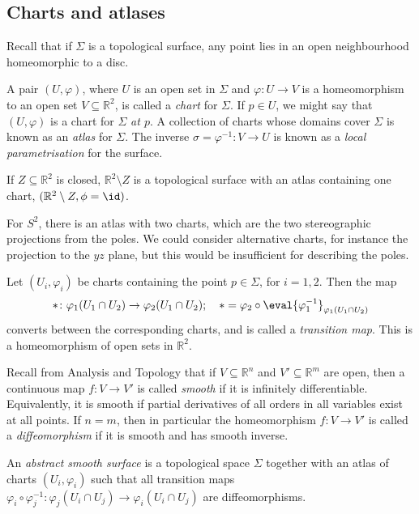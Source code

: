 \subsection{Charts and atlases}
Recall that if \( \Sigma \) is a topological surface, any point lies in an open neighbourhood homeomorphic to a disc.
\begin{definition}
	A pair \( (U, \varphi) \), where \( U \) is an open set in \( \Sigma \) and \( \varphi \colon U \to V \) is a homeomorphism to an open set \( V \subseteq \mathbb R^2 \), is called a \textit{chart} for \( \Sigma \).
	If \( p \in U \), we might say that \( (U, \varphi) \) is a chart for \( \Sigma \) \textit{at \( p \)}.
	A collection of charts whose domains cover \( \Sigma \) is known as an \textit{atlas} for \( \Sigma \).
	The inverse \( \sigma = \varphi^{-1} \colon V \to U \) is known as a \textit{local parametrisation} for the surface.
\end{definition}
\begin{example}
	If \( Z \subseteq \mathbb R^2 \) is closed, \( \mathbb R^2 \setminus Z \) is a topological surface with an atlas containing one chart, \( (\mathbb R^2 \setminus Z, \phi = \id) \).

	For \( S^2 \), there is an atlas with two charts, which are the two stereographic projections from the poles.
	We could consider alternative charts, for instance the projection to the \( yz \) plane, but this would be insufficient for describing the poles.
\end{example}
\begin{definition}
	Let \( (U_i, \varphi_i) \) be charts containing the point \( p \in \Sigma \), for \( i = 1, 2 \).
	Then the map
	\[
		\ast \colon \varphi_1(U_1 \cap U_2) \to \varphi_2(U_1 \cap U_2);\quad \ast = \varphi_2 \circ \eval{\varphi_1^{-1}}_{\varphi_1(U_1 \cap U_2)}
	\]
	converts between the corresponding charts, and is called a \textit{transition map}.
	This is a homeomorphism of open sets in \( \mathbb R^2 \).
\end{definition}
Recall from Analysis and Topology that if \( V \subseteq \mathbb R^n \) and \( V' \subseteq \mathbb R^m \) are open, then a continuous map \( f \colon V \to V' \) is called \textit{smooth} if it is infinitely differentiable.
Equivalently, it is smooth if partial derivatives of all orders in all variables exist at all points.
If \( n = m \), then in particular the homeomorphism \( f \colon V \to V' \) is called a \textit{diffeomorphism} if it is smooth and has smooth inverse.
\begin{definition}
	An \textit{abstract smooth surface} is a topological space \( \Sigma \) together with an atlas of charts \( (U_i, \varphi_i) \) such that all transition maps \( \varphi_i \circ \varphi_j^{-1} \colon \varphi_j(U_i \cap U_j) \to \varphi_i(U_i \cap U_j) \) are diffeomorphisms.
\end{definition}
